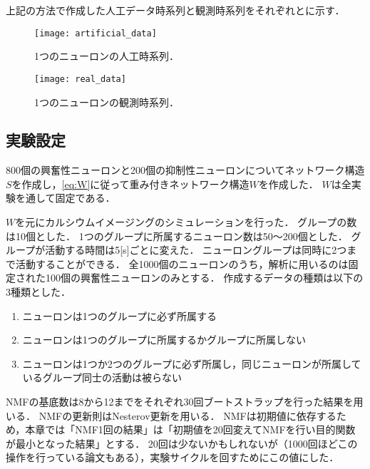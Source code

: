 上記の方法で作成した人工データ時系列と観測時系列をそれぞれとに示す．
\begin{figure}[htbp]
    \begin{minipage}{0.5\hsize}
			\begin{center}
					\texttt{[image: artificial\_data]}
					\caption{1つのニューロンの人工時系列．}
					\label{fig:art}
			\end{center}
		\end{minipage}
    \begin{minipage}{0.5\hsize}
			\begin{center}
					\texttt{[image: real\_data]}
					\caption{1つのニューロンの観測時系列．}
					\label{fig:dat}
			\end{center}
		\end{minipage}
\end{figure}

\subsection{実験設定}
800個の興奮性ニューロンと200個の抑制性ニューロンについてネットワーク構造$S$を作成し，\eqref{eq:W}に従って重み付きネットワーク構造$W$を作成した．
$W$は全実験を通して固定である．

$W$を元にカルシウムイメージングのシミュレーションを行った．
グループの数は10個とした．
1つのグループに所属するニューロン数は50〜200個とした．
グループが活動する時間は5[s]ごとに変えた．
ニューロングループは同時に2つまで活動することができる．
全1000個のニューロンのうち，解析に用いるのは固定された100個の興奮性ニューロンのみとする．
作成するデータの種類は以下の3種類とした．

\begin{enumerate}
  \item ニューロンは1つのグループに必ず所属する
  \item ニューロンは1つのグループに所属するかグループに所属しない
  \item ニューロンは1つか2つのグループに必ず所属し，同じニューロンが所属しているグループ同士の活動は被らない
\end{enumerate}

NMFの基底数は8から12までをそれぞれ30回ブートストラップを行った結果を用いる．
NMFの更新則はNesterov更新\cite{Guan2012}を用いる．
NMFは初期値に依存するため，本章では「NMF1回の結果」は「初期値を20回変えてNMFを行い目的関数が最小となった結果」とする．
20回は少ないかもしれないが（1000回ほどこの操作を行っている論文もある），実験サイクルを回すためにこの値にした．

